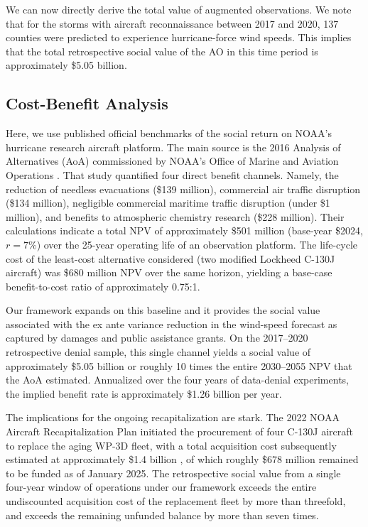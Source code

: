\documentclass[12pt]{article}%
\begin{document}
We can now directly derive the total value of augmented observations. We note that for the storms with aircraft reconnaissance between 2017 and 2020, 137 counties were predicted to experience hurricane-force wind speeds. This implies that the total retrospective social value of the AO in this time period is approximately \$5.05 billion.

\subsection{Cost-Benefit Analysis}

Here, we use published official benchmarks of the social return on NOAA's hurricane research aircraft platform. The main source is the 2016 Analysis of Alternatives (AoA) commissioned by NOAA's Office of Marine and Aviation Operations \citep{ANSER2016ExternalBenefits}. That study quantified four direct benefit channels. Namely, the reduction of needless evacuations (\$139 million), commercial air traffic disruption (\$134 million), negligible commercial maritime traffic disruption (under \$1 million), and benefits to atmospheric chemistry research (\$228 million). Their calculations indicate a total NPV of approximately \$501 million (base-year \$2024, $r = 7\%$) over the 25-year operating life of an observation platform. The life-cycle cost of the least-cost alternative considered (two modified Lockheed C-130J aircraft) was \$680 million NPV over the same horizon, yielding a base-case benefit-to-cost ratio of approximately 0.75:1. 

Our framework expands on this baseline and it provides the social value associated with the ex ante variance reduction in the wind-speed forecast as captured by damages and public assistance grants. On the 2017--2020 retrospective denial sample, this single channel yields a social value of approximately \$5.05 billion or roughly 10 times the entire 2030--2055 NPV that the AoA estimated. Annualized over the four years of data-denial experiments, the implied benefit rate is approximately \$1.26 billion per year. 

The implications for the ongoing recapitalization are stark. The 2022 NOAA Aircraft Recapitalization Plan \citep{NOAA2022AircraftPlan} initiated the procurement of four C-130J aircraft to replace the aging WP-3D fleet, with a total acquisition cost subsequently estimated at approximately \$1.4 billion \citep{GAO2025HurricaneHunter}, of which roughly \$678 million remained to be funded as of January 2025. The retrospective social value from a single four-year window of operations under our framework exceeds the entire undiscounted acquisition cost of the replacement fleet by more than threefold, and exceeds the remaining unfunded balance by more than seven times.
\end{document}
